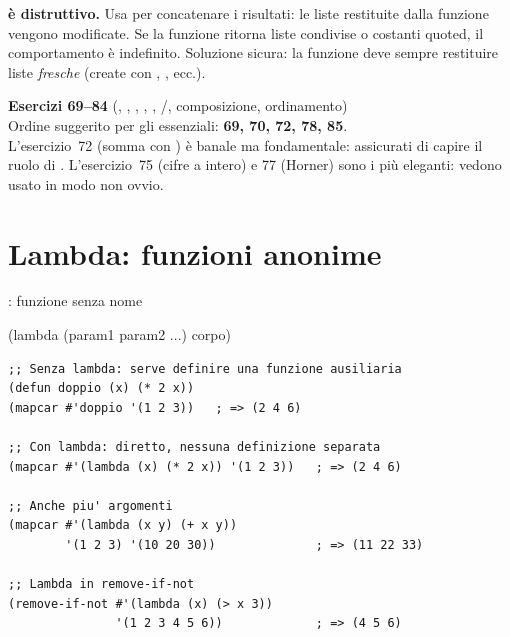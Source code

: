 \begin{attenzione}
\textbf{ è distruttivo.}
Usa  per concatenare i risultati: le liste restituite dalla
funzione vengono modificate. Se la funzione ritorna liste condivise o
costanti quoted, il comportamento è indefinito.
Soluzione sicura: la funzione deve sempre restituire liste \emph{fresche}
(create con , , ecc.).
\end{attenzione}

\begin{workbook}
\textbf{Esercizi 69--84}
(, , , ,
, /, composizione, ordinamento)\\[4pt]
Ordine suggerito per gli essenziali: \textbf{69, 70, 72, 78, 85}.\\[4pt]
L'esercizio~72 (somma con ) è banale ma fondamentale:
assicurati di capire il ruolo di .
L'esercizio~75 (cifre a intero) e 77 (Horner) sono i più eleganti:
vedono  usato in modo non ovvio.
\end{workbook}

\section{Lambda: funzioni anonime}

\begin{concetto}{: funzione senza nome}

\begin{sintassi}
(lambda (param1 param2 ...) corpo)
\end{sintassi}

\end{concetto}

\begin{esempio}
\begin{lstlisting}
;; Senza lambda: serve definire una funzione ausiliaria
(defun doppio (x) (* 2 x))
(mapcar #'doppio '(1 2 3))   ; => (2 4 6)

;; Con lambda: diretto, nessuna definizione separata
(mapcar #'(lambda (x) (* 2 x)) '(1 2 3))   ; => (2 4 6)

;; Anche piu' argomenti
(mapcar #'(lambda (x y) (+ x y))
        '(1 2 3) '(10 20 30))              ; => (11 22 33)

;; Lambda in remove-if-not
(remove-if-not #'(lambda (x) (> x 3))
               '(1 2 3 4 5 6))             ; => (4 5 6)
\end{lstlisting}
\end{esempio}

